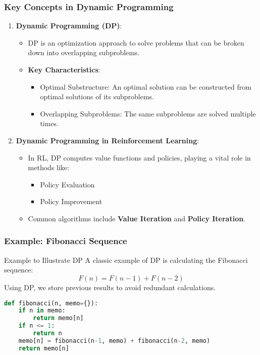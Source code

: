 \documentclass[aspectratio=169]{beamer}
\begin{document}
\begin{frame}
  \frametitle{Key Concepts in Dynamic Programming}
  \begin{enumerate}
    \item \textbf{Dynamic Programming (DP)}:
      \begin{itemize}
        \item DP is an optimization approach to solve problems that can be broken down into overlapping subproblems.
        \item \textbf{Key Characteristics}:
          \begin{itemize}
            \item Optimal Substructure: An optimal solution can be constructed from optimal solutions of its subproblems.
            \item Overlapping Subproblems: The same subproblems are solved multiple times.
          \end{itemize}
      \end{itemize}
  
    \item \textbf{Dynamic Programming in Reinforcement Learning}:
      \begin{itemize}
        \item In RL, DP computes value functions and policies, playing a vital role in methods like:
          \begin{itemize}
            \item Policy Evaluation
            \item Policy Improvement
          \end{itemize}
        \item Common algorithms include \textbf{Value Iteration} and \textbf{Policy Iteration}.
      \end{itemize}
  \end{enumerate}
\end{frame}

\begin{frame}[fragile]
  \frametitle{Example: Fibonacci Sequence}
  \begin{block}{Example to Illustrate DP}
    A classic example of DP is calculating the Fibonacci sequence:
    \begin{equation}
      F(n) = F(n-1) + F(n-2)
    \end{equation}
    Using DP, we store previous results to avoid redundant calculations.
    
    \begin{lstlisting}[language=Python]
def fibonacci(n, memo={}):
    if n in memo:
        return memo[n]
    if n <= 1:
        return n
    memo[n] = fibonacci(n-1, memo) + fibonacci(n-2, memo)
    return memo[n]
    \end{lstlisting}
  \end{block}
\end{frame}
\end{document}
